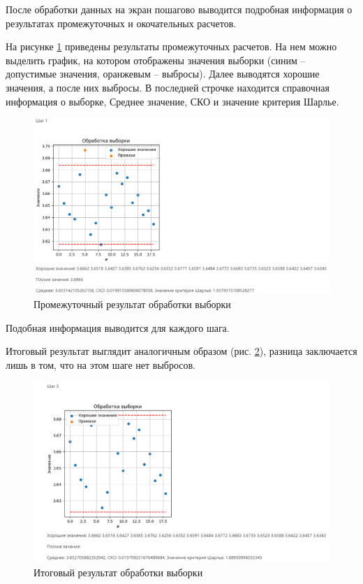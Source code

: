 \documentclass[a4paper,14pt]{article}
\begin{document}
	После обработки данных на экран пошагово выводится подробная информация о результатах промежуточных и окочательных расчетов.
	
	На рисунке \ref{fig:screenshot004} приведены результаты промежуточных расчетов.
	На нем можно выделить график, на котором отображены значения выборки (синим -- допустимые значения, оранжевым -- выбросы).
	Далее выводятся хорошие значения, а после них выбросы.
	В последней строчке находится справочная информация о выборке, Среднее значение, СКО и значение критерия Шарлье. 
	
	\begin{figure}[H]
		\centering
		\includegraphics[width=0.95\linewidth]{images/screenshot004}
		\caption{Промежуточный результат обработки выборки}
		\label{fig:screenshot004}
	\end{figure}

	Подобная информация выводится для каждого шага.	
	
	Итоговый результат выглядит аналогичным образом (рис. \ref{fig:screenshot005}), разница заключается лишь в том, что на этом шаге нет выбросов.
	
	\begin{figure}[H]
		\centering
		\includegraphics[width=0.95\linewidth]{images/screenshot005}
		\caption{Итоговый результат обработки выборки}
		\label{fig:screenshot005}
	\end{figure}
	
\end{document}
